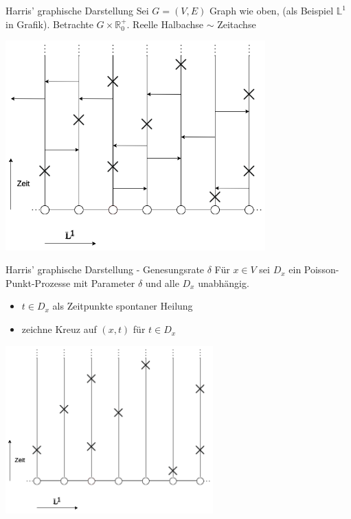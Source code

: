 \documentclass[11pt]{beamer}
\begin{document}

\begin{frame}{Harris' graphische Darstellung}
Sei $G = (V, E)$ Graph wie oben, (als Beispiel $\mathbb{L}^1$  in Grafik). Betrachte $G \times \mathbb{R}^+_0$. Reelle Halbachse $\sim$ Zeitachse
\begin{center}
    \includegraphics[width=0.75\textwidth]{images/contact process arrows.png}
\end{center}
\end{frame}

\begin{frame}{Harris' graphische Darstellung - Genesungsrate $\delta$}
    Für $x \in V$ sei $D_x$ ein Poisson-Punkt-Prozesse mit Parameter $\delta$ und alle $D_x$ unabhängig.
    \begin{itemize}
        \item $t \in D_x$ als Zeitpunkte spontaner Heilung
        \item zeichne Kreuz auf $(x, t)$ für $t \in D_x$
    \end{itemize}
    \begin{center}
        \includegraphics[width=0.6\textwidth]{images/contact process crosses.png}
    \end{center}
\end{frame}
\end{document}
